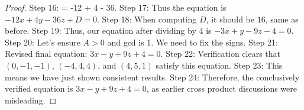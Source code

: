 \documentclass{article}
\begin{document}
\begin{proof}
Step 16: = -12 + 4 - 36.
Step 17: Thus the equation is $-12x + 4y - 36z + D = 0$.
Step 18: When computing $D$, it should be $16$, same as before.
Step 19: Thus, our equation after dividing by 4 is $-3x + y - 9z - 4 = 0$.
Step 20: Let's ensure $A > 0$ and gcd is 1. We need to fix the signs.
Step 21: Revised final equation: $3x - y + 9z + 4 = 0$.
Step 22: Verification clears that $(0,-1,-1)$, $(-4,4,4)$, and $(4,5,1)$ satisfy this equation.
Step 23: This means we have just shown consistent results.
Step 24: Therefore, the conclusively verified equation is $3x - y + 9z + 4 = 0$, as earlier cross product discussions were misleading.
\end{proof}
\end{document}
